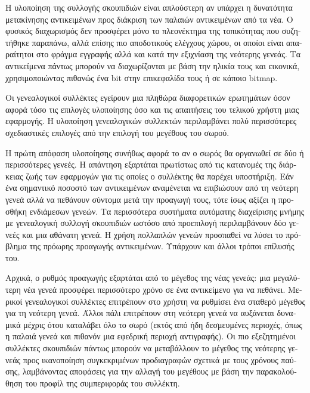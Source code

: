 \begin{greek}
Η υλοποίηση της συλλογής σκουπιδιών είναι απλούστερη αν υπάρχει
η δυνατότητα μετακίνησης αντικειμένων προς διάκριση των παλαιών
αντικειμένων από τα νέα. Ο φυσικός διαχωρισμός δεν προσφέρει
μόνο το πλεονέκτημα της τοπικότητας που συζητήθηκε παραπάνω,
αλλά επίσης πιο αποδοτικούς ελέγχους χώρου, οι οποίοι είναι
απαραίτητοι στο φράγμα εγγραφής αλλά και κατά την εξιχνίαση
της νεότερης γενεάς. Τα αντικείμενα πάντως μπορούν να διαχωρίζονται
με βάση την ηλικία τους και εικονικά, χρησιμοποιώντας πιθανώς
ένα bit στην επικεφαλίδα τους ή σε κάποιο bitmap.

Οι γενεαλογικοί συλλέκτες εγείρουν μια πληθώρα διαφορετικών
ερωτημάτων όσον αφορά τόσο τις επιλογές υλοποίησης όσο και
τις απαιτήσεις του τελικού χρήστη μιας εφαρμογής. Η υλοποίηση
γενεαλογικών συλλεκτών περιλαμβάνει πολύ περισσότερες σχεδιαστικές
επιλογές από την επιλογή του μεγέθους του σωρού.

Η πρώτη απόφαση υλοποίησης συνήθως αφορά το αν ο σωρός θα
οργανωθεί σε δύο ή περισσότερες γενεές. Η απάντηση εξαρτάται
πρωτίστως από τις κατανομές της διάρκειας ζωής των εφαρμογών
για τις οποίες ο συλλέκτης θα παρέχει υποστήριξη. Εάν ένα
σημαντικό ποσοστό των αντικειμένων αναμένεται να επιβιώσουν
από τη νεότερη γενεά αλλά να πεθάνουν σύντομα μετά την προαγωγή
τους, τότε ίσως αξίζει η προσθήκη ενδιάμεσων γενεών. Τα περισσότερα
συστήματα αυτόματης διαχείρισης μνήμης με γενεαλογική συλλογή
σκουπιδιών ωστόσο από προεπιλογή περιλαμβάνουν δύο γενεές και
μια αθάνατη γενεά. Η χρήση πολλαπλών γενεών προσπαθεί να λύσει
το πρόβλημα της πρόωρης προαγωγής αντικειμένων. Υπάρχουν και
άλλοι τρόποι επίλυσής του.

Αρχικά, ο ρυθμός προαγωγής εξαρτάται από το μέγεθος της νέας
γενεάς: μια μεγαλύτερη νέα γενεά προσφέρει περισσότερο χρόνο
σε ένα αντικείμενο για να πεθάνει. Μερικοί γενεαλογικοί συλλέκτες
επιτρέπουν στο χρήστη να ρυθμίσει ένα σταθερό μέγεθος για τη
νεότερη γενεά. Άλλοι πάλι επιτρέπουν στη νεότερη γενεά να
αυξάνεται δυναμικά μέχρις ότου καταλάβει όλο το σωρό (εκτός
από ήδη δεσμευμένες περιοχές, όπως η παλαιά γενεά και πιθανόν
μια εφεδρική περιοχή αντιγραφής). Οι πιο εξεζητημένοι συλλέκτες
σκουπιδιών πάντως μπορούν να μεταβάλλουν το μέγεθος της νεότερης
γενεάς προς ικανοποίηση συγκεκριμένων προδιαγραφών σχετικά
με τους χρόνους παύσης, λαμβάνοντας αποφάσεις για την αλλαγή
του μεγέθους με βάση την παρακολούθηση του προφίλ της συμπεριφοράς
του συλλέκτη.


\end{greek}
